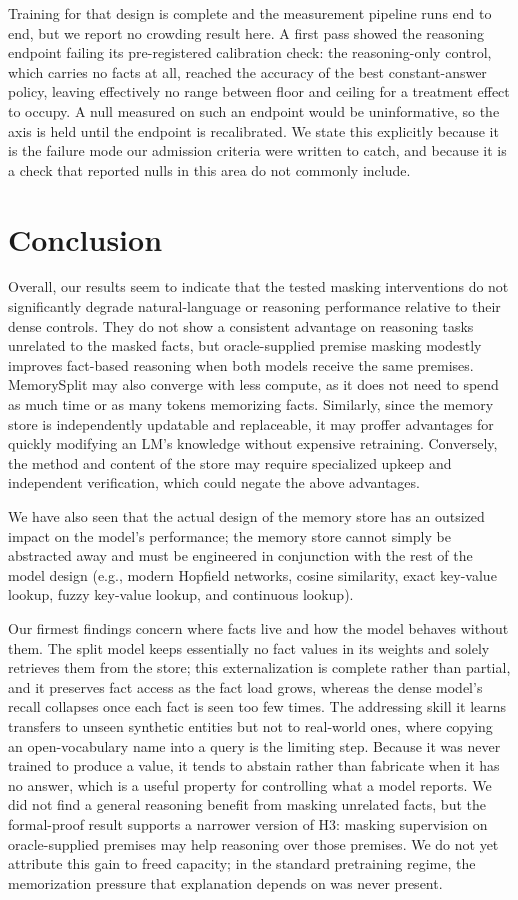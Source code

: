 \documentclass{article}
\begin{document}
Training for that design is complete and the measurement pipeline runs end to end, but we report no
crowding result here. A first pass showed the reasoning endpoint failing its pre-registered calibration
check: the reasoning-only control, which carries no facts at all, reached the accuracy of the best
constant-answer policy, leaving effectively no range between floor and ceiling for a treatment effect to
occupy. A null measured on such an endpoint would be uninformative, so the axis is held until the endpoint
is recalibrated. We state this explicitly because it is the failure mode our admission criteria were
written to catch, and because it is a check that reported nulls in this area do not commonly include.

\section{Conclusion}
Overall, our results seem to indicate that the tested masking interventions do not significantly degrade natural-language or reasoning performance relative to their dense controls. They do not show a consistent advantage on reasoning tasks unrelated to the masked facts, but oracle-supplied premise masking modestly improves fact-based reasoning when both models receive the same premises. MemorySplit may also converge with less compute, as it does not need to spend as much time or as many tokens memorizing facts. Similarly, since the memory store is independently updatable and replaceable, it may proffer advantages for quickly modifying an LM's knowledge without expensive retraining. Conversely, the method and content of the store may require specialized upkeep and independent verification, which could negate the above advantages.

We have also seen that the actual design of the memory store has an outsized impact on the model's performance; the memory store cannot simply be abstracted away and must be engineered in conjunction with the rest of the model design (e.g., modern Hopfield networks, cosine similarity, exact key-value lookup, fuzzy key-value lookup, and continuous lookup).

Our firmest findings concern where facts live and how the model behaves without them. The split model keeps essentially no fact values in its weights and solely retrieves them from the store; this externalization is complete rather than partial, and it preserves fact access as the fact load grows, whereas the dense model's recall collapses once each fact is seen too few times. The addressing skill it learns transfers to unseen synthetic entities but not to real-world ones, where copying an open-vocabulary name into a query is the limiting step. Because it was never trained to produce a value, it tends to abstain rather than fabricate when it has no answer, which is a useful property for controlling what a model reports. We did not find a general reasoning benefit from masking unrelated facts, but the formal-proof result supports a narrower version of H3: masking supervision on oracle-supplied premises may help reasoning over those premises. We do not yet attribute this gain to freed capacity; in the standard pretraining regime, the memorization pressure that explanation depends on was never present.
\end{document}
